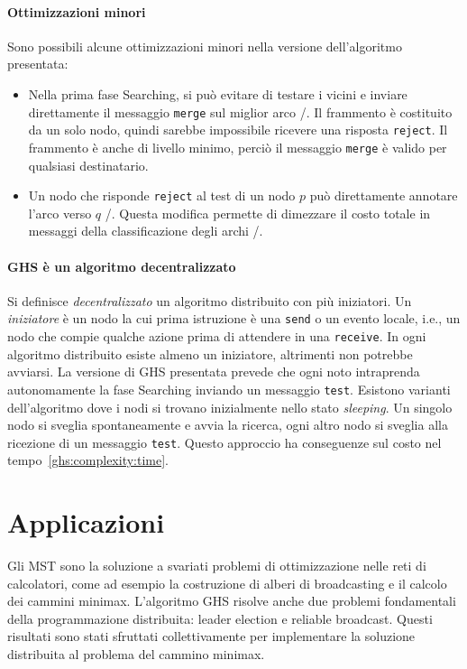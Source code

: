 \documentclass[target=bach,aauheader=,style=]{thud}
\newcommand{\eng}[1]{\foreignlanguage{english}{#1}}
\begin{document}
\paragraph{Ottimizzazioni minori}
Sono possibili alcune ottimizzazioni minori nella versione dell'algoritmo presentata:
\begin{itemize}
    \item Nella prima fase \eng{Searching}, si può evitare di testare i vicini e inviare direttamente il messaggio \lstinline{merge} sul miglior arco \undecided/. Il frammento è costituito da un solo nodo, quindi sarebbe impossibile ricevere una risposta \lstinline{reject}. Il frammento è anche di livello minimo, perciò il messaggio \lstinline{merge} è valido per qualsiasi destinatario.
    \item Un nodo che risponde \lstinline{reject} al test di un nodo $p$ può direttamente annotare l'arco verso $q$ \rejected/. Questa modifica permette di dimezzare il costo totale in messaggi della classificazione degli archi \rejected/.
\end{itemize}

\paragraph{GHS è un algoritmo decentralizzato}
Si definisce \emph{decentralizzato} un algoritmo distribuito con più iniziatori. Un \emph{iniziatore} è un nodo la cui prima istruzione è una \lstinline{send} o un evento locale, i.e., un nodo che compie qualche azione prima di attendere in una \lstinline{receive}. In ogni algoritmo distribuito esiste almeno un iniziatore, altrimenti non potrebbe avviarsi. La versione di GHS presentata prevede che ogni noto intraprenda autonomamente la fase \eng{Searching} inviando un messaggio \lstinline{test}. Esistono varianti dell'algoritmo dove i nodi si trovano inizialmente nello stato \emph{\eng{sleeping}}. Un singolo nodo si sveglia spontaneamente e avvia la ricerca, ogni altro nodo si sveglia alla ricezione di un messaggio \lstinline{test}. Questo approccio ha conseguenze sul costo nel tempo~\ref{ghs:complexity:time}.

\section{Applicazioni}

Gli MST sono la soluzione a svariati problemi di ottimizzazione nelle reti di calcolatori, come ad esempio la costruzione di alberi di \eng{broadcasting} e il calcolo dei cammini minimax. L'algoritmo GHS risolve anche due problemi fondamentali della programmazione distribuita: leader \eng{election} e \eng{reliable broadcast}.
Questi risultati sono stati sfruttati collettivamente per implementare la soluzione distribuita al problema del cammino minimax.
\end{document}
